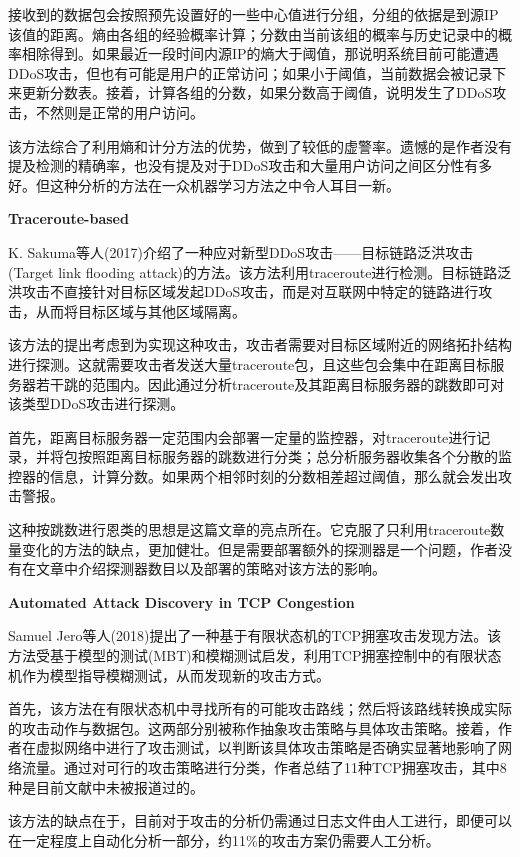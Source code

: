 \documentclass[12pt]{article} %
\begin{document}
接收到的数据包会按照预先设置好的一些中心值进行分组，分组的依据是到源IP该值的距离。熵由各组的经验概率计算；分数由当前该组的概率与历史记录中的概率相除得到。如果最近一段时间内源IP的熵大于阈值，那说明系统目前可能遭遇DDoS攻击，但也有可能是用户的正常访问；如果小于阈值，当前数据会被记录下来更新分数表。接着，计算各组的分数，如果分数高于阈值，说明发生了DDoS攻击，不然则是正常的用户访问。

该方法综合了利用熵和计分方法的优势，做到了较低的虚警率。遗憾的是作者没有提及检测的精确率，也没有提及对于DDoS攻击和大量用户访问之间区分性有多好。但这种分析的方法在一众机器学习方法之中令人耳目一新。

\textbf{Traceroute-based}

K. Sakuma等人(2017)介绍了一种应对新型DDoS攻击——目标链路泛洪攻击(Target link flooding attack)的方法。该方法利用traceroute进行检测。目标链路泛洪攻击不直接针对目标区域发起DDoS攻击，而是对互联网中特定的链路进行攻击，从而将目标区域与其他区域隔离。

该方法的提出考虑到为实现这种攻击，攻击者需要对目标区域附近的网络拓扑结构进行探测。这就需要攻击者发送大量traceroute包，且这些包会集中在距离目标服务器若干跳的范围内。因此通过分析traceroute及其距离目标服务器的跳数即可对该类型DDoS攻击进行探测。

首先，距离目标服务器一定范围内会部署一定量的监控器，对traceroute进行记录，并将包按照距离目标服务器的跳数进行分类；总分析服务器收集各个分散的监控器的信息，计算分数。如果两个相邻时刻的分数相差超过阈值，那么就会发出攻击警报。

这种按跳数进行恩类的思想是这篇文章的亮点所在。它克服了只利用traceroute数量变化的方法的缺点，更加健壮。但是需要部署额外的探测器是一个问题，作者没有在文章中介绍探测器数目以及部署的策略对该方法的影响。

\textbf{Automated Attack Discovery in TCP Congestion}

Samuel Jero等人(2018)提出了一种基于有限状态机的TCP拥塞攻击发现方法。该方法受基于模型的测试(MBT)和模糊测试启发，利用TCP拥塞控制中的有限状态机作为模型指导模糊测试，从而发现新的攻击方式。

首先，该方法在有限状态机中寻找所有的可能攻击路线；然后将该路线转换成实际的攻击动作与数据包。这两部分别被称作抽象攻击策略与具体攻击策略。接着，作者在虚拟网络中进行了攻击测试，以判断该具体攻击策略是否确实显著地影响了网络流量。通过对可行的攻击策略进行分类，作者总结了11种TCP拥塞攻击，其中8种是目前文献中未被报道过的。

该方法的缺点在于，目前对于攻击的分析仍需通过日志文件由人工进行，即便可以在一定程度上自动化分析一部分，约11\%的攻击方案仍需要人工分析。
\end{document}
